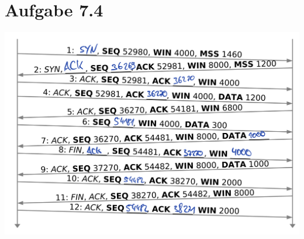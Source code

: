 \documentclass[12pt, a4paper]{article}
\begin{document}
\newpage


\section*{Aufgabe 7.4}
\includegraphics[scale=0.5]{7.4.png}
\end{document}
